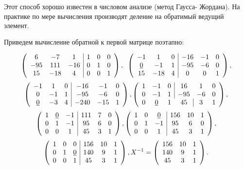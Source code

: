 \documentclass{mai_book}
\begin{document}
{Этот способ хорошо известен в числовом анализе (метод Гаусса-
Жордана). На практике по мере вычисления производят деление на
обратимый ведущий элемент.

Приведем вычисление обратной к первой матрице поэтапно:

\[ \left( \begin{array}{cccccc}
6 & -7 & 1 &   \multicolumn{1}{|c}{1} & 0 & 0 \\
-95 & 111 & -16 & \multicolumn{1}{|c}{0} & 1 & 0 \\
15 & -18 & 4 & \multicolumn{1}{|c}{0} & 0 & 1
\end{array} \right),\;\;
\left( \begin{array}{cccccc}
-1 &  1 & 0 & \multicolumn{1}{|c}{-16} & -1 & 0 \\
\underline{0} & -1 & 1 & \multicolumn{1}{|c}{-95} & -6 & 0 \\
15 & -18 & 4 &\multicolumn{1}{|c}{0} & 0 & 1
\end{array} \right), \]
\[ \left( \begin{array}{cccccc}
-1 &  1 & 0 & \multicolumn{1}{|c}{-16} & -1 & 0 \\
0 & -1 & 1 & \multicolumn{1}{|c}{-95} & -6 & 0 \\
\underline{0} & -3 & 4 & \multicolumn{1}{|c}{-240} & -15 & 1
\end{array} \right),
\left( \begin{array}{cccccc}
1 & -1 & 0 & \multicolumn{1}{|c}{16} & 1 & 0 \\
0 & -1 & 1 & \multicolumn{1}{|c}{-95} & -6 & 0 \\
0 & \underline{0} & 1 & 45 & \multicolumn{1}{|c}{3} & 1
\end{array} \right), \]
\[ \left( \begin{array}{cccccc}
1 & \underline{0} & -1 & \multicolumn{1}{|c}{111} & 7 & 0 \\
0 & 1 & -1 & \multicolumn{1}{|c}{95} & 6 & 0 \\
0 & 0 & 1 & \multicolumn{1}{|c}{45} & 3 & 1
\end{array} \right),
\left( \begin{array}{cccccc}
1 &  0 & \underline{0} & \multicolumn{1}{|c}{156} & 10 & 1 \\
0 & 1 & -1 & \multicolumn{1}{|c}{95} & 6 & 0 \\
0 & 0 & 1 & \multicolumn{1}{|c}{45} & 3 & 1
\end{array} \right), \]
\[ \left( \begin{array}{cccccc}
1 &  0 & 0 & \multicolumn{1}{|c}{156} & 10 & 1 \\
0 & 1 & \underline{0} & \multicolumn{1}{|c}{140} & 9 & 1 \\
0 & 0 & 1 & \multicolumn{1}{|c}{45} & 3 & 1
\end{array} \right),
X^{-1} = {\left( \begin{array}{ccc}
156 & 10 & 1 \\
140 & 9 & 1  \\
45 & 3 & 1
\end{array} \right).} \]

}
\end{document}
